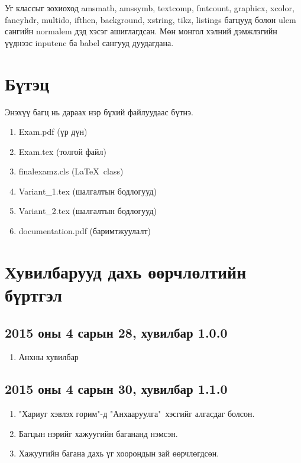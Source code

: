 \documentclass[10pt]{article}
\theoremstyle{definition}
\begin{document}
\par Уг классыг зохиоход amsmath, amssymb, textcomp, fmtcount, graphicx, xcolor, fancyhdr, multido, ifthen, background, xstring, tikz, listings багцууд болон ulem сангийн normalem дэд хэсэг ашиглагдсан. Мөн монгол хэлний дэмжлэгийн үүднээс inputenc ба babel сангууд дуудагдана.

\section{Бүтэц}

Энэхүү багц нь дараах нэр бүхий файлуудаас бүтнэ.
\begin{enumerate}
 \item Exam.pdf (үр дүн)
 \item Exam.tex (толгой файл)
 \item finalexamz.cls (\LaTeX\ class)
 \item Variant\_1.tex (шалгалтын бодлогууд)
 \item Variant\_2.tex (шалгалтын бодлогууд)
 \item documentation.pdf (баримтжуулалт)
\end{enumerate}

\section{Хувилбарууд дахь өөрчлөлтийн бүртгэл}

\subsection{2015 оны 4 сарын 28, хувилбар 1.0.0}

\begin{enumerate}
 \item Анхны хувилбар
\end{enumerate}

\subsection{2015 оны 4 сарын 30, хувилбар 1.1.0}

\begin{enumerate}
 \item "Хариуг хэвлэх горим"{}-д "Анхааруулга"\ хэсгийг алгасдаг болсон.
 \item Багцын нэрийг хажуугийн багананд нэмсэн.
 \item Хажуугийн багана дахь үг хоорондын зай өөрчлөгдсөн.
\end{enumerate}
\end{document}
